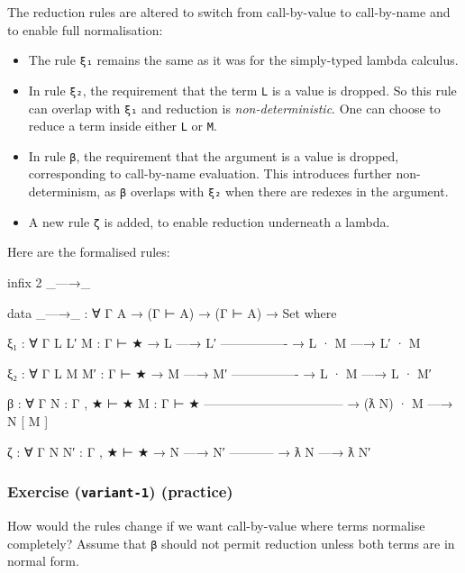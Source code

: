 The reduction rules are altered to switch from call-by-value to
call-by-name and to enable full normalisation:

\begin{itemize}
\item
  The rule \texttt{ξ₁} remains the same as it was for the simply-typed
  lambda calculus.
\item
  In rule \texttt{ξ₂}, the requirement that the term \texttt{L} is a
  value is dropped. So this rule can overlap with \texttt{ξ₁} and
  reduction is \emph{non-deterministic}. One can choose to reduce a term
  inside either \texttt{L} or \texttt{M}.
\item
  In rule \texttt{β}, the requirement that the argument is a value is
  dropped, corresponding to call-by-name evaluation. This introduces
  further non-determinism, as \texttt{β} overlaps with \texttt{ξ₂} when
  there are redexes in the argument.
\item
  A new rule \texttt{ζ} is added, to enable reduction underneath a
  lambda.
\end{itemize}

Here are the formalised rules:

\begin{fence}
\begin{code}
infix 2 _—→_

data _—→_ : ∀ {Γ A} → (Γ ⊢ A) → (Γ ⊢ A) → Set where

  ξ₁ : ∀ {Γ} {L L′ M : Γ ⊢ ★}
    → L —→ L′
      ----------------
    → L · M —→ L′ · M

  ξ₂ : ∀ {Γ} {L M M′ : Γ ⊢ ★}
    → M —→ M′
      ----------------
    → L · M —→ L · M′

  β : ∀ {Γ} {N : Γ , ★ ⊢ ★} {M : Γ ⊢ ★}
      ---------------------------------
    → (ƛ N) · M —→ N [ M ]

  ζ : ∀ {Γ} {N N′ : Γ , ★ ⊢ ★}
    → N —→ N′
      -----------
    → ƛ N —→ ƛ N′
\end{code}
\end{fence}

\hypertarget{exercise-variant-1-practice}{%
\subsubsection{\texorpdfstring{Exercise (\texttt{variant-1})
(practice)}{Exercise (variant-1) (practice)}}\label{exercise-variant-1-practice}}

How would the rules change if we want call-by-value where terms
normalise completely? Assume that \texttt{β} should not permit reduction
unless both terms are in normal form.


